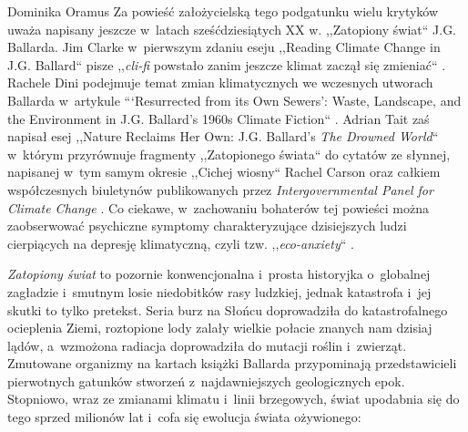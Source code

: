 \begin{artplenv}{Dominika Oramus}
Za powieść założycielską tego podgatunku wielu krytyków uważa napisany jeszcze w~latach sześćdziesiątych XX w. ,,Zatopiony świat`` J.G. Ballarda. Jim Clarke w~pierwszym zdaniu eseju ,,Reading Climate Change in J.G. Ballard`` pisze ,,\textit{cli-fi} powstało zanim jeszcze klimat zaczął się zmieniać``
\parencite[][tłum. D.O.]{clarke_reading_2013}. %
 Rachele Dini podejmuje temat zmian klimatycznych we wczesnych utworach Ballarda w~artykule “‘Resurrected from its Own Sewers’: Waste, Landscape, and the Environment in J.G. Ballard's 1960s Climate Fiction`` 
\parencite[][]{dini_resurrected_2021}. %
 Adrian Tait zaś napisał esej ,,Nature Reclaims Her Own: J.G. Ballard's \textit{The Drowned World}`` 
\parencite[][]{mcgrath_nature_2016} %
 w~którym przyrównuje fragmenty ,,Zatopionego świata`` do cytatów ze słynnej, napisanej w~tym samym okresie ,,Cichej wiosny`` Rachel Carson oraz całkiem współczesnych biuletynów publikowanych przez \textit{Intergovernmental Panel for Climate Change} 
\parencite[][s.~158]{mcgrath_nature_2016}. %
 Co ciekawe, w~zachowaniu bohaterów tej powieści można zaobserwować psychiczne symptomy charakteryzujące dzisiejszych ludzi cierpiących na depresję klimatyczną, czyli tzw. ,,\textit{eco-anxiety}`` 
\parencite[][]{gifford_largely_2016}.%


\textit{Zatopiony świat} to pozornie konwencjonalna i~prosta historyjka o~globalnej zagładzie i~smutnym losie niedobitków rasy ludzkiej, jednak katastrofa i~jej skutki to tylko pretekst. Seria burz na Słońcu doprowadziła do katastrofalnego ocieplenia Ziemi, roztopione lody zalały wielkie połacie znanych nam dzisiaj lądów, a~wzmożona radiacja doprowadziła do mutacji roślin i~zwierząt. Zmutowane organizmy na kartach książki Ballarda przypominają przedstawicieli pierwotnych gatunków stworzeń z~najdawniejszych geologicznych epok. Stopniowo, wraz ze zmianami klimatu i~linii brzegowych, świat upodabnia się do tego sprzed milionów lat i~cofa się ewolucja świata ożywionego:



\end{artplenv}
